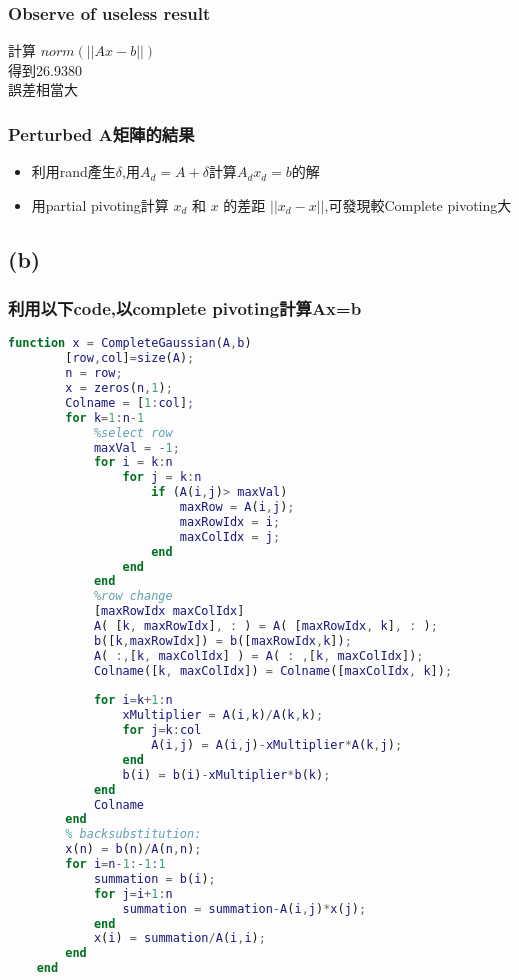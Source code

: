 \documentclass[12pt]{article}
\begin{document}
        \subsubsection*{Observe of useless result}
            計算 $norm(||Ax-b||)$\\
            得到26.9380\\
            誤差相當大
        \subsubsection*{Perturbed A矩陣的結果}
            \begin{itemize}
                \item 利用rand產生$\delta$,用$A_d=A+\delta$計算$A_dx_d=b$的解
                \item 用partial pivoting計算 $x_d$ 和 $x$ 的差距 $||x_d - x||$,可發現較Complete pivoting大
            \end{itemize}
    \subsection*{(b)}
        \subsubsection*{利用以下code,以complete pivoting計算Ax=b}
        \begin{lstlisting}[language={Matlab}]
    function x = CompleteGaussian(A,b)
        [row,col]=size(A);
        n = row;
        x = zeros(n,1);
        Colname = [1:col];
        for k=1:n-1  
            %select row 
            maxVal = -1;
            for i = k:n
                for j = k:n 
                    if (A(i,j)> maxVal)
                        maxRow = A(i,j);
                        maxRowIdx = i;
                        maxColIdx = j;
                    end
                end
            end
            %row change
            [maxRowIdx maxColIdx]
            A( [k, maxRowIdx], : ) = A( [maxRowIdx, k], : );
            b([k,maxRowIdx]) = b([maxRowIdx,k]);
            A( :,[k, maxColIdx] ) = A( : ,[k, maxColIdx]);
            Colname([k, maxColIdx]) = Colname([maxColIdx, k]);
    
            for i=k+1:n
                xMultiplier = A(i,k)/A(k,k);
                for j=k:col
                    A(i,j) = A(i,j)-xMultiplier*A(k,j);
                end
                b(i) = b(i)-xMultiplier*b(k);
            end
            Colname
        end
        % backsubstitution:
        x(n) = b(n)/A(n,n);
        for i=n-1:-1:1
            summation = b(i);
            for j=i+1:n
                summation = summation-A(i,j)*x(j);
            end
            x(i) = summation/A(i,i);
        end
    end
    \end{lstlisting}
\end{document}
